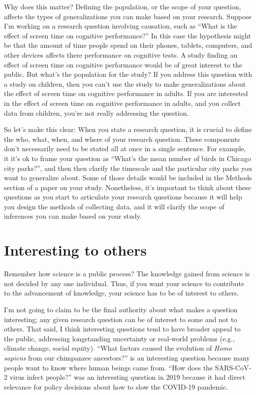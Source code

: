 \documentclass[
]{book}
\begin{document}
Why does this matter? Defining the population, or the scope of your question, affects the types of generalizations you can make based on your research. Suppose I'm working on a research question involving causation, such as ``What is the effect of screen time on cognitive performance?'' In this case the hypothesis might be that the amount of time people spend on their phones, tablets, computers, and other devices affects there performance on cognitive tests. A study finding an effect of screen time on cognitive performance would be of great interest to the public. But what's the population for the study? If you address this question with a study on children, then you can't use the study to make generalizations about the effect of screen time on cognitive performance in adults. If you are interested in the effect of screen time on cognitive performance in adults, and you collect data from children, you're not really addressing the question.

So let's make this clear: When you state a research question, it is crucial to define the who, what, when, and where of your research question. These components don't necessarily need to be stated all at once in a single sentence. For example, it it's ok to frame your question as ``What's the mean number of birds in Chicago city parks?'', and then then clarify the timescale and the particular city parks you want to generalize about. Some of those details would be included in the Methods section of a paper on your study. Nonetheless, it's important to think about these questions as you start to articulate your research questions because it will help you design the methods of collecting data, and it will clarify the scope of inferences you can make based on your study.

\section{Interesting to others}\label{interesting-to-others}

Remember how science is a public process? The knowledge gained from science is not decided by any one individual. Thus, if you want your science to contribute to the advancement of knowledge, your science has to be of interest to others.

I'm not going to claim to be the final authority about what makes a question interesting; any given research question can be of interest to some and not to others. That said, I think interesting questions tend to have broader appeal to the public, addressing longstanding uncertainty or real-world problems (e.g., climate change, social equity). ``What factors caused the evolution of \emph{Homo sapiens} from our chimpanzee ancestors?'' is an interesting question because many people want to know where human beings came from. ``How does the SARS-CoV-2 virus infect people?'' was an interesting question in 2019 because it had direct relevance for policy decisions about how to slow the COVID-19 pandemic.
\end{document}
